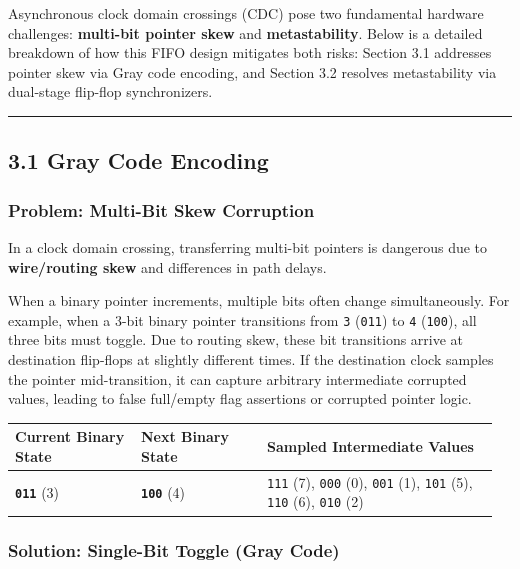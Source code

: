 \documentclass[
]{article}
\newcounter{none} %
\begin{document}
Asynchronous clock domain crossings (CDC) pose two fundamental hardware
challenges: \textbf{multi-bit pointer skew} and \textbf{metastability}.
Below is a detailed breakdown of how this FIFO design mitigates both
risks: Section 3.1 addresses pointer skew via Gray code encoding, and Section 3.2 resolves metastability via dual-stage flip-flop synchronizers.

\begin{center}\rule{0.5\linewidth}{0.5pt}\end{center}

\subsection{3.1 Gray Code Encoding}\label{31-gray-code-encoding}

\subsubsection{Problem: Multi-Bit Skew
Corruption}\label{problem-multi-bit-skew-corruption}

In a clock domain crossing, transferring multi-bit pointers is dangerous
due to \textbf{wire/routing skew} and differences in path delays.

When a binary pointer increments, multiple bits often change
simultaneously. For example, when a 3-bit binary pointer transitions
from \texttt{3} (\texttt{011}) to \texttt{4} (\texttt{100}), all three
bits must toggle. Due to routing skew, these bit transitions arrive at
destination flip-flops at slightly different times. If the destination
clock samples the pointer mid-transition, it can capture arbitrary
intermediate corrupted values, leading to false full/empty flag
assertions or corrupted pointer logic.

{\def\LTcaptype{none} %
\begin{longtable}[]{@{}p{0.25\linewidth}p{0.25\linewidth}p{0.46\linewidth}@{}}
\toprule\noalign{}
Current Binary State & Next Binary State & Sampled Intermediate
Values \\
\midrule\noalign{}
\endhead
\bottomrule\noalign{}
\endlastfoot
\textbf{\texttt{011}} (3) & \textbf{\texttt{100}} (4) & \texttt{111}
(7), \texttt{000} (0), \texttt{001} (1), \texttt{101} (5), \texttt{110}
(6), \texttt{010} (2) \\
\end{longtable}
}

\subsubsection{Solution: Single-Bit Toggle (Gray
Code)}\label{solution-single-bit-toggle-gray-code}
\end{document}
